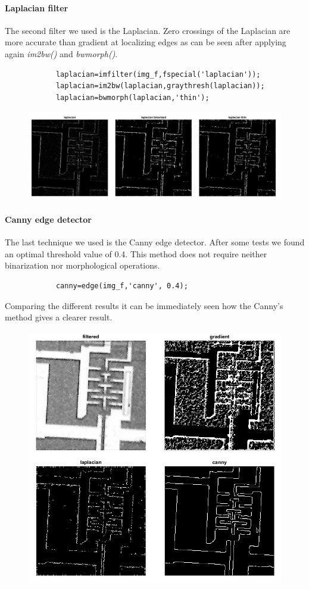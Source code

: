 \documentclass[12pt,a4paper,oneside,final,titlepage,openany,onecolumn]{article}
\begin{document}
		\paragraph{Laplacian filter\\}
		The second filter we used is the Laplacian. Zero crossings of the Laplacian are more accurate than gradient at localizing edges as can be seen after applying again \textit{im2bw()} and \textit{bwmorph()}.
		\begin{lstlisting}
			laplacian=imfilter(img_f,fspecial('laplacian'));
			laplacian=im2bw(laplacian,graythresh(laplacian)); 
			laplacian=bwmorph(laplacian,'thin');
		\end{lstlisting}
		\begin{figure}[h!]
			\includegraphics[width=\linewidth]{images/laplacian.png}
		\end{figure}
		\paragraph{Canny edge detector\\}
		The last technique we used is the Canny edge detector. After some tests we found an optimal threshold value of 0.4. This method does not require neither binarization nor morphological operations.
		\begin{lstlisting}
			canny=edge(img_f,'canny', 0.4);
		\end{lstlisting}
		Comparing the different results it can be immediately seen how the Canny's method gives a clearer result.
		\begin{figure}[H]
			\centering
			\includegraphics[width=.81\linewidth]{images/edge_detect.png}
		\end{figure}
		
\end{document}
